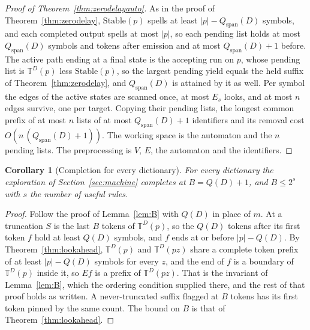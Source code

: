 \documentclass[11pt,a4paper]{article}
\theoremstyle{definition}
\theoremstyle{plain}
\newtheorem{corollary}{Corollary}
\newcommand{\T}{\mathbb{T}}
\newcommand{\Stable}{\mathrm{Stable}}
\begin{document}
\begin{proof}[Proof of Theorem~\ref{thm:zerodelayauto}]
As in the proof of Theorem~\ref{thm:zerodelay}, \(\Stable(p)\) spells at least \(|p| - Q_{\mathrm{span}}(D)\) symbols,
and each completed output spells at most \(|p|\), so each pending list holds at most \(Q_{\mathrm{span}}(D)\) symbols
and tokens after emission and at most \(Q_{\mathrm{span}}(D) + 1\) before. The active path ending at a final state is
the accepting run on \(p\), whose pending list is \(\T^D(p)\) less \(\Stable(p)\), so the largest pending yield equals
the held suffix of Theorem~\ref{thm:zerodelay}, and \(Q_{\mathrm{span}}(D)\) is attained by it as well. Per symbol the
edges of the active states are scanned once, at most \(E_s\) looks, and at most \(n\) edges survive, one per target.
Copying their pending lists, the longest common prefix of at most \(n\) lists of at most \(Q_{\mathrm{span}}(D) + 1\)
identifiers and its removal cost \(O(n\,(Q_{\mathrm{span}}(D) + 1))\). The working space is the automaton and the \(n\)
pending lists. The preprocessing is \(V\), \(E\), the automaton and the identifiers.
\end{proof}


\begin{corollary}[Completion for every dictionary]\label{cor:completion}
For every dictionary the exploration of Section~\ref{sec:machine} completes at \(B = Q(D) + 1\), and \(B \le 2^{s}\)
with \(s\) the number of useful rules.
\end{corollary}

\begin{proof}
Follow the proof of Lemma~\ref{lem:B} with \(Q(D)\) in place of \(m\). At a truncation \(S\) is the last \(B\) tokens of
\(\T^D(p)\), so the \(Q(D)\) tokens after its first token \(f\) hold at least \(Q(D)\) symbols, and \(f\) ends at or
before \(|p| - Q(D)\). By Theorem~\ref{thm:lookahead}, \(\T^D(p)\) and \(\T^D(pz)\) share a complete token prefix of at
least \(|p| - Q(D)\) symbols for every \(z\), and the end of \(f\) is a boundary of \(\T^D(p)\) inside it, so \(Ef\) is
a prefix of \(\T^D(pz)\). That is the invariant of Lemma~\ref{lem:B}, which the ordering condition supplied there, and
the rest of that proof holds as written. A never-truncated suffix flagged at \(B\) tokens has its first token pinned by
the same count. The bound on \(B\) is that of Theorem~\ref{thm:lookahead}.
\end{proof}
\end{document}
